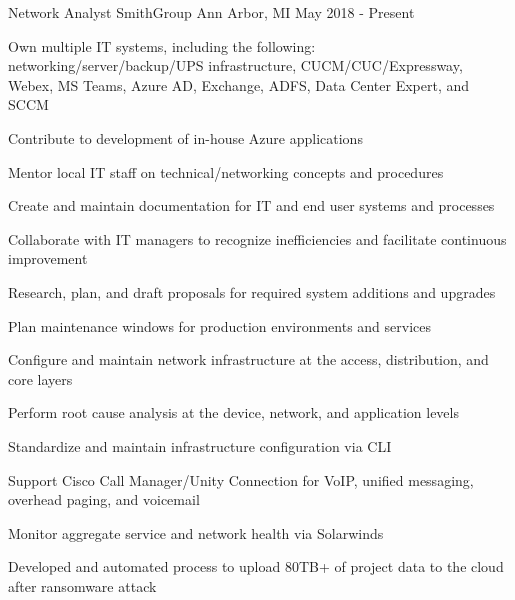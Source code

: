 

\begin{cventries}

  \cventry
    {Network Analyst} %
    {SmithGroup} %
    {Ann Arbor, MI} %
    {May 2018 - Present} %
    {
      \begin{cvitems} %
        \item {Own multiple IT systems, including the following: networking/server/backup/UPS infrastructure, CUCM/CUC/Expressway, Webex, MS Teams, Azure AD, Exchange,  ADFS, Data Center Expert, and SCCM}
        \item {Contribute to development of in-house Azure applications}
        \item {Mentor local IT staff on technical/networking concepts and procedures}
        \item {Create and maintain documentation for IT and end user systems and processes}
        \item {Collaborate with IT managers to recognize inefficiencies and facilitate continuous improvement}
        \item {Research, plan, and draft proposals for required system additions and upgrades}
        \item {Plan maintenance windows for production environments and services}
        \item {Configure and maintain network infrastructure at the access, distribution, and core layers}
        \item {Perform root cause analysis at the device, network, and application levels}
        \item {Standardize and maintain infrastructure configuration via CLI}
        \item {Support Cisco Call Manager/Unity Connection for VoIP, unified messaging, overhead paging, and voicemail}
        \item {Monitor aggregate service and network health via Solarwinds}
        \item {Developed and automated process to upload 80TB+ of project data to the cloud after ransomware attack}

\end{cvitems}}
\end{cventries}
